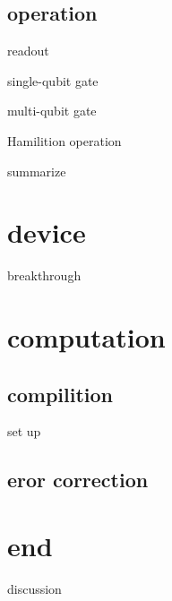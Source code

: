 \documentclass[18 pt]{beamer}
\begin{document}
\subsection{operation}
\begin{frame}{readout}
\end{frame}
\begin{frame}{single-qubit gate}
  
\end{frame}
\begin{frame}{multi-qubit gate}
\end{frame}
\begin{frame}{Hamilition operation}
\end{frame}
\begin{frame}{summarize}
\end{frame}
\section{device}
\begin{frame}{breakthrough}
\end{frame}
\section{computation}
\subsection{compilition}
\begin{frame}{set up}
\end{frame}
\subsection{eror correction}
\section*{end}
\begin{frame}{discussion}
\end{frame}
\end{document}
